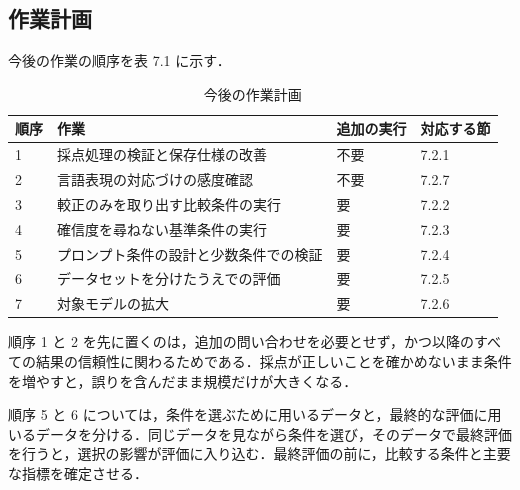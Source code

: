 \subsection{作業計画}

今後の作業の順序を表 7.1 に示す．

\begin{table}[t]
\centering
\small
\caption{今後の作業計画}
\label{tab:7.1}
\begin{tabular}{|l|l|l|l|}
\hline
順序 & 作業 & 追加の実行 & 対応する節 \\
\hline
1 & 採点処理の検証と保存仕様の改善 & 不要 & 7.2.1 \\
2 & 言語表現の対応づけの感度確認 & 不要 & 7.2.7 \\
3 & 較正のみを取り出す比較条件の実行 & 要 & 7.2.2 \\
4 & 確信度を尋ねない基準条件の実行 & 要 & 7.2.3 \\
5 & プロンプト条件の設計と少数条件での検証 & 要 & 7.2.4 \\
6 & データセットを分けたうえでの評価 & 要 & 7.2.5 \\
7 & 対象モデルの拡大 & 要 & 7.2.6 \\
\hline
\end{tabular}
\end{table}

順序 1 と 2 を先に置くのは，追加の問い合わせを必要とせず，かつ以降のすべての結果の信頼性に関わるためである．採点が正しいことを確かめないまま条件を増やすと，誤りを含んだまま規模だけが大きくなる．

順序 5 と 6 については，条件を選ぶために用いるデータと，最終的な評価に用いるデータを分ける．同じデータを見ながら条件を選び，そのデータで最終評価を行うと，選択の影響が評価に入り込む．最終評価の前に，比較する条件と主要な指標を確定させる．
